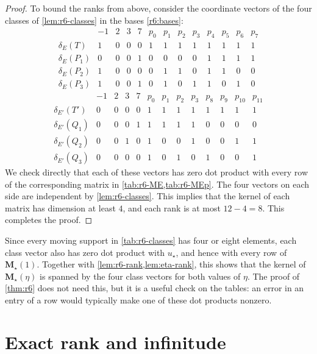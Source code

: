 \documentclass[12pt,oneside,openany]{book}
\theoremstyle{definition}
\theoremstyle{plain}
\numberwithin{equation}{chapter}
\theoremstyle{plain}
\theoremstyle{definition}
\theoremstyle{remark}
\begin{document}
\begin{proof}
To bound the ranks from above, consider the coordinate vectors of the four classes of \cref{lem:r6-classes} in the bases \eqref{r6:bases}:
\[
\begin{array}{c|cccc|cccccccc}
 & -1 & 2 & 3 & 7 & p_0 & p_1 & p_2 & p_3 & p_4 & p_5 & p_6 & p_7\\
\hline
\delta_E(T) & 1 & 0 & 0 & 0 & 1 & 1 & 1 & 1 & 1 & 1 & 1 & 1 \\
\delta_E(P_1) & 0 & 0 & 0 & 1 & 0 & 0 & 0 & 0 & 1 & 1 & 1 & 1 \\
\delta_E(P_2) & 1 & 0 & 0 & 0 & 0 & 1 & 1 & 0 & 1 & 1 & 0 & 0 \\
\delta_E(P_3) & 1 & 0 & 0 & 1 & 0 & 1 & 0 & 1 & 1 & 0 & 1 & 0
\end{array}
\]
\[
\begin{array}{c|cccc|cccccccc}
 & -1 & 2 & 3 & 7 & p_0 & p_1 & p_2 & p_3 & p_8 & p_9 & p_{10} & p_{11}\\
\hline
\delta_{E'}(T') & 0 & 0 & 0 & 0 & 1 & 1 & 1 & 1 & 1 & 1 & 1 & 1 \\
\delta_{E'}(Q_1) & 0 & 0 & 0 & 1 & 1 & 1 & 1 & 1 & 0 & 0 & 0 & 0 \\
\delta_{E'}(Q_2) & 0 & 0 & 1 & 0 & 1 & 0 & 0 & 1 & 0 & 0 & 1 & 1 \\
\delta_{E'}(Q_3) & 0 & 0 & 0 & 0 & 1 & 0 & 1 & 0 & 1 & 0 & 0 & 1
\end{array}
\]
We check directly that each of these vectors has zero dot product with every row of the corresponding matrix in \cref{tab:r6-ME,tab:r6-MEp}. The four vectors on each side are independent by \cref{lem:r6-classes}. This implies that the kernel of each matrix has dimension at least $4$, and each rank is at most $12-4=8$. This completes the proof.
\end{proof}

Since every moving support in \cref{tab:r6-classes} has four or eight elements, each class vector also has zero dot product with $u_\star$, and hence with every row of $\mathbf M_\star(1)$. Together with \cref{lem:r6-rank,lem:eta-rank}, this shows that the kernel of $\mathbf M_\star(\eta)$ is spanned by the four class vectors for both values of $\eta$. The proof of \cref{thm:r6} does not need this, but it is a useful check on the tables: an error in an entry of a row would typically make one of these dot products nonzero.

\section{Exact rank and infinitude}\label{sec:r6-theorem}
\end{document}
